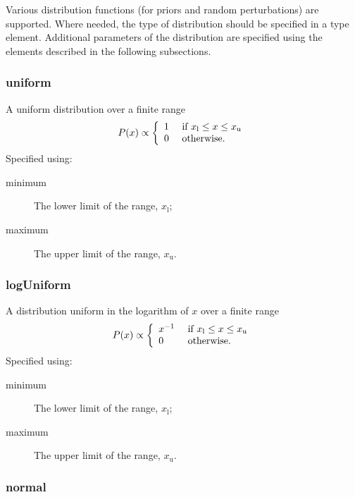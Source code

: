 Various distribution functions (for priors and random perturbations) are supported. Where needed, the type of distribution should be specified in a {\normalfont \ttfamily type} element. Additional parameters of the distribution are specified using the elements described in the following subsections.

\subsubsection{{\normalfont \ttfamily uniform}}

A uniform distribution over a finite range
\begin{equation}
P(x) \propto \left\{ \begin{array}{ll} 1 & \hbox{ if } x_{\mathrm l} \leq x \leq x_{\mathrm u} \\ 0 & \hbox{ otherwise.}  \end{array} \right.
\end{equation}
Specified using:
\begin{description}
\item[{\normalfont \ttfamily minimum}] The lower limit of the range, $x_{\mathrm l}$;
\item[{\normalfont \ttfamily maximum}] The upper limit of the range, $x_{\mathrm u}$.
\end{description}

\subsubsection{{\normalfont \ttfamily logUniform}}

A distribution uniform in the logarithm of $x$ over a finite range
\begin{equation}
P(x) \propto \left\{ \begin{array}{ll} x^{-1} & \hbox{ if } x_{\mathrm l} \leq x \leq x_{\mathrm u} \\ 0 & \hbox{ otherwise.}  \end{array} \right.
\end{equation}
Specified using:
\begin{description}
\item[{\normalfont \ttfamily minimum}] The lower limit of the range, $x_{\mathrm l}$;
\item[{\normalfont \ttfamily maximum}] The upper limit of the range, $x_{\mathrm u}$.
\end{description}

\subsubsection{{\normalfont \ttfamily normal}}

